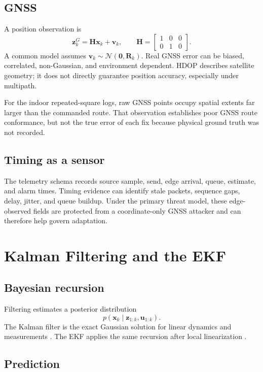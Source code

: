 \documentclass[11pt,oneside]{book}
\newcommand{\vect}[1]{\bm{#1}}
\begin{document}
\section{GNSS}

A position observation is
\[
\vect{z}^{G}_k=\vect{H}\vect{x}_k+\vect{v}_k,\qquad
\vect{H}=
\begin{bmatrix}
1&0&0\\0&1&0
\end{bmatrix}.
\]
A common model assumes $\vect{v}_k\sim\mathcal{N}(\vect{0},\vect{R}_k)$.
Real GNSS error can be biased, correlated, non-Gaussian, and environment
dependent. HDOP describes satellite geometry; it does not directly guarantee
position accuracy, especially under multipath.

For the indoor repeated-square logs, raw GNSS points occupy spatial extents far
larger than the commanded route. That observation establishes poor GNSS route
conformance, but not the true error of each fix because physical ground truth
was not recorded.

\section{Timing as a sensor}

The telemetry schema records source sample, send, edge arrival, queue,
estimate, and alarm times. Timing evidence can identify stale packets,
sequence gaps, delay, jitter, and queue buildup. Under the primary threat
model, these edge-observed fields are protected from a coordinate-only GNSS
attacker and can therefore help govern adaptation.

\chapter{Kalman Filtering and the EKF}

\section{Bayesian recursion}

Filtering estimates a posterior distribution
\[
p(\vect{x}_k\mid\vect{z}_{1:k},\vect{u}_{1:k}).
\]
The Kalman filter is the exact Gaussian solution for linear dynamics and
measurements \cite{kalman1960,welchbishop}. The EKF applies the same recursion
after local linearization \cite{thrun2005,jazwinski1970}.

\section{Prediction}
\end{document}
